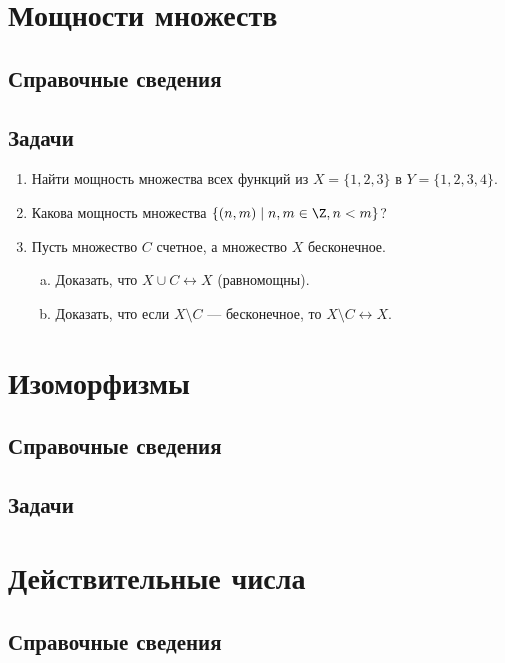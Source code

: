 \section{Мощности множеств}\label{powers}

\subsection*{Справочные сведения}

\subsection*{Задачи}

\begin{enumerate}
\item Найти мощность множества всех функций из $X=\{1,2,3\}$ в $Y=\{1,2,3,4\}$.
\item Какова мощность множества $\{(n,m)\mid n,m\in\Z, n<m\}$?
\item Пусть множество $C$ счетное, а множество $X$ бесконечное.
\begin{enumerate}[a)]
\item Доказать, что $X\cup C\leftrightarrow X$ (равномощны).
\item Доказать, что если $X\setminus C$ --- бесконечное, то $X\setminus C\leftrightarrow X$.
\end{enumerate}
\end{enumerate}

\section{Изоморфизмы}

\subsection*{Справочные сведения}

\subsection*{Задачи}


\section{Действительные числа}

\subsection*{Справочные сведения}


